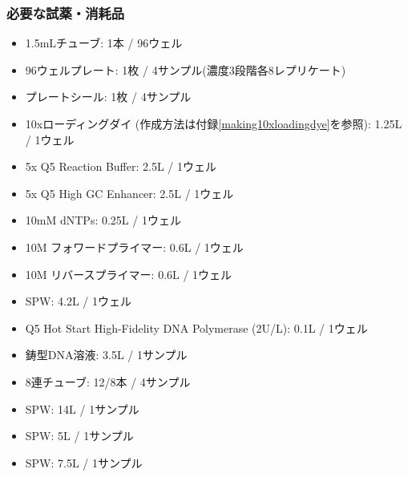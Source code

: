 \documentclass[titlepage,10pt,a4paper]{jsbook}
\begin{document}
\subsubsection{必要な試薬・消耗品}
\begin{itemize}
\item 1.5mLチューブ: 1本 / 96ウェル
\item 96ウェルプレート: 1枚 / 4サンプル(濃度3段階各8レプリケート)
\item プレートシール: 1枚 / 4サンプル
\item 10xローディングダイ (作成方法は付録\ref{making10xloadingdye}を参照): 1.25{\textmu}L / 1ウェル
\item 5x Q5 Reaction Buffer: 2.5{\textmu}L / 1ウェル
\item 5x Q5 High GC Enhancer: 2.5{\textmu}L / 1ウェル
\item 10mM dNTPs: 0.25{\textmu}L / 1ウェル
\item 10{\textmu}M フォワードプライマー: 0.6{\textmu}L / 1ウェル
\item 10{\textmu}M リバースプライマー: 0.6{\textmu}L / 1ウェル
\item SPW: 4.2{\textmu}L / 1ウェル
\item Q5 Hot Start High-Fidelity DNA Polymerase (2U/{\textmu}L): 0.1{\textmu}L / 1ウェル
\item 鋳型DNA溶液: 3.5{\textmu}L / 1サンプル
\item 8連チューブ: 12/8本 / 4サンプル
\item SPW: 14{\textmu}L / 1サンプル
\item SPW: 5{\textmu}L / 1サンプル
\item SPW: 7.5{\textmu}L / 1サンプル
\end{itemize}
\end{document}
